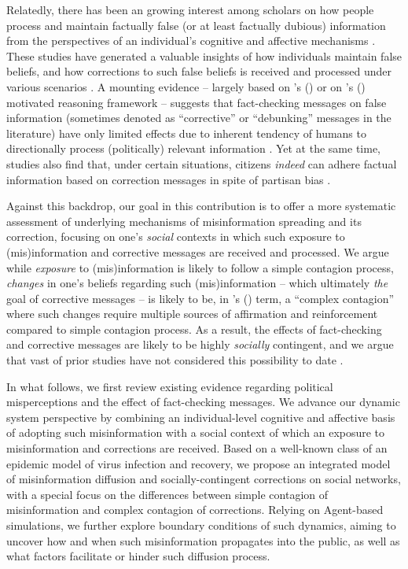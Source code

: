 \documentclass[man, 12pt, a4paper]{apa6}
\begin{document}
Relatedly, there has been an growing interest among scholars on how people process and maintain factually false (or at least factually dubious) information from the perspectives of an individual's cognitive and affective mechanisms \parencite{LEWANDOWSKY_JARMC2017, garrett2016driving, weeks2015emotions}. These studies have generated a valuable insights of how individuals maintain false beliefs, and how corrections to such false beliefs is received and processed under various scenarios \parencite{LEWANDOWSKY_JARMC2017, thorson_2016}. A mounting evidence -- largely based on \citeauthor{kunda1990}'s (\citeyear{kunda1990}) or on \citeauthor{taber2006}'s (\citeyear{taber2006}) motivated reasoning framework -- suggests that fact-checking messages on false information (sometimes denoted as \enquote{corrective} or \enquote{debunking} messages in the literature) have only limited effects due to inherent tendency of humans to directionally process (politically) relevant information \parencite{thorson_2016, nyhan2010corrections, taber2006}. Yet at the same time, studies also find that, under certain situations, citizens \emph{indeed} can adhere factual information based on correction messages in spite of partisan bias \parencite[e.g.,][]{Wood2018, Garrett_Weeks_2013, weeks2015emotions}. 

Against this backdrop, our goal in this contribution is to offer a more systematic assessment of underlying mechanisms of misinformation spreading and its correction, focusing on one's \emph{social} contexts in which such exposure to (mis)information and corrective messages are received and processed. We argue while \emph{exposure} to (mis)information is likely to follow a simple contagion process, \emph{changes} in one's beliefs regarding such (mis)information -- which ultimately \emph{the} goal of corrective messages -- is likely to be, in \citeauthor{centola2007complex}'s (\citeyear{centola2007complex}) term, a \enquote{complex contagion} where such changes require multiple sources of affirmation and reinforcement compared to simple contagion process. As a result, the effects of fact-checking and corrective messages are likely to be highly \emph{socially} contingent, and we argue that vast of prior studies have not considered this possibility to date \parencite[yet for a notable exception, see][]{margolin2017}.    

In what follows, we first review existing evidence regarding political misperceptions and the effect of fact-checking messages. We advance our dynamic system perspective by combining an individual-level cognitive and affective basis of adopting such misinformation with a social context of which an exposure to misinformation and corrections are received. Based on a well-known class of an epidemic model of virus infection and recovery, we propose an integrated model of misinformation diffusion and socially-contingent corrections on social networks, with a special focus on the differences between simple contagion of misinformation and complex contagion of corrections. Relying on Agent-based simulations, we further explore boundary conditions of such dynamics, aiming to uncover how and when such misinformation propagates into the public, as well as what factors facilitate or hinder such diffusion process.
\end{document}
